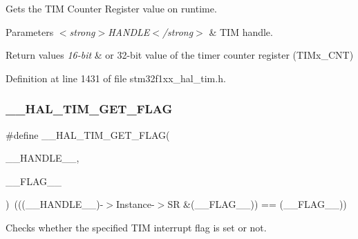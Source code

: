 Gets the T\+IM Counter Register value on runtime. 


\begin{DoxyParams}{Parameters}
{\em $<$strong$>$\+H\+A\+N\+D\+L\+E$<$/strong$>$} & T\+IM handle. \\
\hline
\end{DoxyParams}

\begin{DoxyRetVals}{Return values}
{\em 16-\/bit} & or 32-\/bit value of the timer counter register (T\+I\+Mx\+\_\+\+C\+NT) \\
\hline
\end{DoxyRetVals}


Definition at line 1431 of file stm32f1xx\+\_\+hal\+\_\+tim.\+h.

\mbox{\label{group___t_i_m___exported___macros_ga96d98c66ad9d85f00c148de99888ef19}} 
\subsubsection{\texorpdfstring{\+\_\+\+\_\+\+H\+A\+L\+\_\+\+T\+I\+M\+\_\+\+G\+E\+T\+\_\+\+F\+L\+AG}{\_\_HAL\_TIM\_GET\_FLAG}}
{\footnotesize\ttfamily \#define \+\_\+\+\_\+\+H\+A\+L\+\_\+\+T\+I\+M\+\_\+\+G\+E\+T\+\_\+\+F\+L\+AG(\begin{DoxyParamCaption}\item[{}]{\+\_\+\+\_\+\+H\+A\+N\+D\+L\+E\+\_\+\+\_\+,  }\item[{}]{\+\_\+\+\_\+\+F\+L\+A\+G\+\_\+\+\_\+ }\end{DoxyParamCaption})~(((\+\_\+\+\_\+\+H\+A\+N\+D\+L\+E\+\_\+\+\_\+)-\/$>$Instance-\/$>$SR \&(\+\_\+\+\_\+\+F\+L\+A\+G\+\_\+\+\_\+)) == (\+\_\+\+\_\+\+F\+L\+A\+G\+\_\+\+\_\+))}



Checks whether the specified T\+IM interrupt flag is set or not. 


